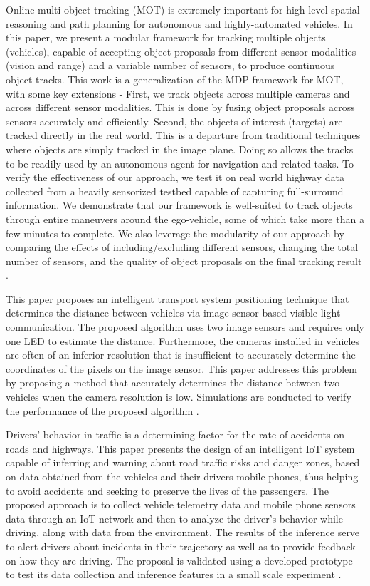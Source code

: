 Online multi-object tracking (MOT) is extremely important for high-level spatial reasoning and path planning for autonomous and highly-automated vehicles. In this paper, we present a modular framework for tracking multiple objects (vehicles), capable of accepting object proposals from different sensor modalities (vision and range) and a variable number of sensors, to produce continuous object tracks. This work is a generalization of the MDP framework for MOT, with some key extensions - First, we track objects across multiple cameras and across different sensor modalities. This is done by fusing object proposals across sensors accurately and efficiently. Second, the objects of interest (targets) are tracked directly in the real world. This is a departure from traditional techniques where objects are simply tracked in the image plane. Doing so allows the tracks to be readily used by an autonomous agent for navigation and related tasks. To verify the effectiveness of our approach, we test it on real world highway data collected from a heavily sensorized testbed capable of capturing full-surround information. We demonstrate that our framework is well-suited to track objects through entire maneuvers around the ego-vehicle, some of which take more than a few minutes to complete. We also leverage the modularity of our approach by comparing the effects of including/excluding different sensors, changing the total number of sensors, and the quality of object proposals on the final tracking result \cite{Rangesh2019}.

This paper proposes an intelligent transport system positioning technique that determines the distance between vehicles via image sensor-based visible light communication. The proposed algorithm uses two image sensors and requires only one LED to estimate the distance. Furthermore, the cameras installed in vehicles are often of an inferior resolution that is insufficient to accurately determine the coordinates of the pixels on the image sensor. This paper addresses this problem by proposing a method that accurately determines the distance between two vehicles when the camera resolution is low. Simulations are conducted to verify the performance of the proposed algorithm \cite{Tram2018}.

Drivers' behavior in traffic is a determining factor for the rate of accidents on roads and highways. This paper presents the design of an intelligent IoT system capable of inferring and warning about road traffic risks and danger zones, based on data obtained from the vehicles and their drivers mobile phones, thus helping to avoid accidents and seeking to preserve the lives of the passengers. The proposed approach is to collect vehicle telemetry data and mobile phone sensors data through an IoT network and then to analyze the driver's behavior while driving, along with data from the environment. The results of the inference serve to alert drivers about incidents in their trajectory as well as to provide feedback on how they are driving. The proposal is validated using a developed prototype to test its data collection and inference features in a small scale experiment \cite{Daniel}.

